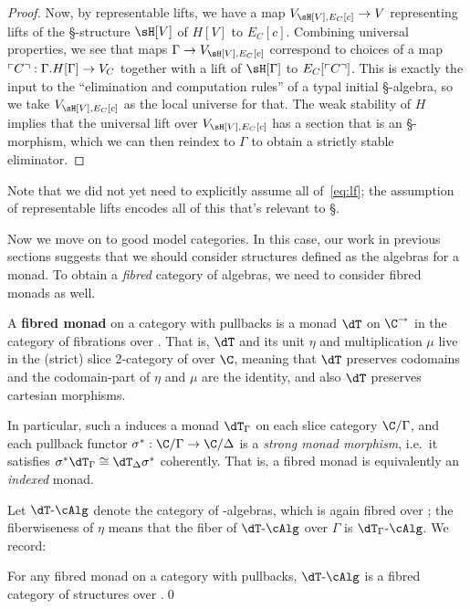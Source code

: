 \begin{enumerate}
\begin{proof}
  Now, by representable lifts, we have a map $V_{\sH[V],E_C[c]} \to V$ representing lifts of the \S-structure $\sH[V]$ of $H[V]$ to $E_C[c]$.
  Combining universal properties, we see that maps $\Gamma\to V_{\sH[V],E_C[c]}$ correspond to choices of a map $\ulcorner C\urcorner:\Gamma.H[\Gamma]\to V_C$ together with a lift of $\sH[\Gamma]$ to $E_C[\ulcorner C\urcorner]$.
  This is exactly the input to the ``elimination and computation rules'' of a typal initial \S-algebra, so we take $V_{\sH[V],E_C[c]}$ as the local universe for that.
  The weak stability of $H$ implies that the universal lift over $V_{\sH[V],E_C[c]}$ has a section that is an \S-morphism, which we can then reindex to $\Gamma$ to obtain a strictly stable eliminator.
\end{proof}

Note that we did not yet need to explicitly assume all of~\eqref{eq:lf}; the assumption of representable lifts encodes all of this that's relevant to \S.

Now we move on to good model categories.
In this case, our work in previous sections suggests that we should consider structures defined as the algebras for a monad.
To obtain a \emph{fibred} category of algebras, we need to consider fibred monads as well.

\begin{defn}
  A \textbf{fibred monad} on a category \C with pullbacks is a monad $\dT$ on $\C^\to$ in the category of fibrations over \C.
  That is, $\dT$ and its unit $\eta$ and multiplication $\mu$ live in the (strict) slice 2-category of \cCat over $\C$, meaning that $\dT$ preserves codomains and the codomain-part of $\eta$ and $\mu$ are the identity, and also $\dT$ preserves cartesian morphisms.
\end{defn}

In particular, such a \dT induces a monad $\dT_\Gamma$ on each slice category $\C/\Gamma$, and each pullback functor $\sigma^* : \C/\Gamma \to \C/\Delta$ is a \emph{strong monad morphism}, i.e.\ it satisfies $\sigma^* \dT_\Gamma \cong \dT_\Delta \sigma^*$ coherently.
That is, a fibred monad is equivalently an \emph{indexed} monad.

Let $\dT\alg$ denote the category of \dT-algebras, which is again fibred over \C; the fiberwiseness of $\eta$ means that the fiber of $\dT\alg$ over $\Gamma$ is $\dT_\Gamma\alg$.
We record:

\begin{lem}
  For any fibred monad \dT on a category \C with pullbacks, $\dT\alg$ is a fibred category of structures over \C.\qed
\end{lem}


\end{enumerate}
